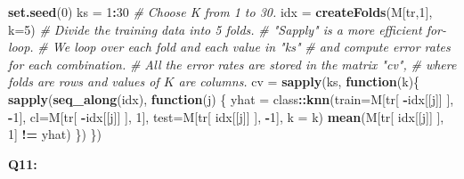 \documentclass[]{article}
\newenvironment{Shaded}{\begin{snugshade}}{\end{snugshade}}
\newcommand{\KeywordTok}[1]{\textcolor[rgb]{0.13,0.29,0.53}{\textbf{#1}}}
\newcommand{\DataTypeTok}[1]{\textcolor[rgb]{0.13,0.29,0.53}{#1}}
\newcommand{\DecValTok}[1]{\textcolor[rgb]{0.00,0.00,0.81}{#1}}
\newcommand{\StringTok}[1]{\textcolor[rgb]{0.31,0.60,0.02}{#1}}
\newcommand{\CommentTok}[1]{\textcolor[rgb]{0.56,0.35,0.01}{\textit{#1}}}
\newcommand{\ControlFlowTok}[1]{\textcolor[rgb]{0.13,0.29,0.53}{\textbf{#1}}}
\newcommand{\OperatorTok}[1]{\textcolor[rgb]{0.81,0.36,0.00}{\textbf{#1}}}
\newcommand{\NormalTok}[1]{#1}
\begin{document}
\begin{Shaded}
\begin{Highlighting}[]
\KeywordTok{set.seed}\NormalTok{(}\DecValTok{0}\NormalTok{)}
\NormalTok{ks =}\StringTok{ }\DecValTok{1}\OperatorTok{:}\DecValTok{30} \CommentTok{# Choose K from 1 to 30.}
\NormalTok{idx =}\StringTok{ }\KeywordTok{createFolds}\NormalTok{(M[tr,}\DecValTok{1}\NormalTok{], }\DataTypeTok{k=}\DecValTok{5}\NormalTok{) }\CommentTok{# Divide the training data into 5 folds.}
\CommentTok{# "Sapply" is a more efficient for-loop. }
\CommentTok{# We loop over each fold and each value in "ks"}
\CommentTok{# and compute error rates for each combination.}
\CommentTok{# All the error rates are stored in the matrix "cv", }
\CommentTok{# where folds are rows and values of $K$ are columns.}
\NormalTok{cv =}\StringTok{ }\KeywordTok{sapply}\NormalTok{(ks, }\ControlFlowTok{function}\NormalTok{(k)\{ }
  \KeywordTok{sapply}\NormalTok{(}\KeywordTok{seq_along}\NormalTok{(idx), }\ControlFlowTok{function}\NormalTok{(j) \{}
\NormalTok{    yhat =}\StringTok{ }\NormalTok{class}\OperatorTok{::}\KeywordTok{knn}\NormalTok{(}\DataTypeTok{train=}\NormalTok{M[tr[ }\OperatorTok{-}\NormalTok{idx[[j]] ], }\OperatorTok{-}\DecValTok{1}\NormalTok{],}
               \DataTypeTok{cl=}\NormalTok{M[tr[ }\OperatorTok{-}\NormalTok{idx[[j]] ], }\DecValTok{1}\NormalTok{],}
               \DataTypeTok{test=}\NormalTok{M[tr[ idx[[j]] ], }\OperatorTok{-}\DecValTok{1}\NormalTok{], }\DataTypeTok{k =}\NormalTok{ k)}
    \KeywordTok{mean}\NormalTok{(M[tr[ idx[[j]] ], }\DecValTok{1}\NormalTok{] }\OperatorTok{!=}\StringTok{ }\NormalTok{yhat)}
\NormalTok{  \})}
\NormalTok{\})}
\end{Highlighting}
\end{Shaded}

\textbf{Q11:}
\end{document}
